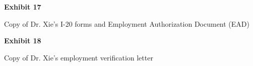 \documentclass{article}
\begin{document}


\vspace*{\fill}

\begin{center}

{\LARGE \bf
Exhibit 17
}

\vspace{10\baselineskip}

{\large Copy of Dr. Xie’s I-20 forms and Employment Authorization Document (EAD)}

\end{center}
\vspace*{\fill}



\vspace*{\fill}

\begin{center}

{\LARGE \bf
Exhibit 18
}

\vspace{10\baselineskip}

{\large Copy of Dr. Xie’s employment verification letter}

\end{center}
\vspace*{\fill}



\vspace*{\fill}
\end{document}
